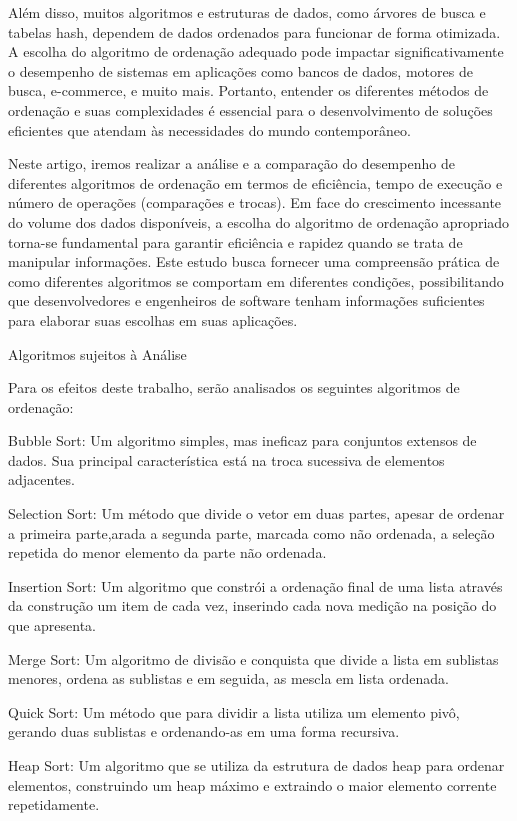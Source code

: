 \documentclass[tcc1,project]{uftex}
\begin{document}
Além disso, muitos algoritmos e estruturas de dados, como árvores de busca e tabelas hash, dependem de dados ordenados para funcionar de forma otimizada. A escolha do algoritmo de ordenação adequado pode impactar significativamente o desempenho de sistemas em aplicações como bancos de dados, motores de busca, e-commerce, e muito mais. Portanto, entender os diferentes métodos de ordenação e suas complexidades é essencial para o desenvolvimento de soluções eficientes que atendam às necessidades do mundo contemporâneo.

Neste artigo, iremos realizar a análise e a comparação do desempenho de diferentes algoritmos de ordenação em termos de eficiência, tempo de execução e número de operações (comparações e trocas). Em face do crescimento incessante do volume dos dados disponíveis, a escolha do algoritmo de ordenação apropriado torna-se fundamental para garantir eficiência e rapidez quando se trata de manipular informações. Este estudo busca fornecer uma compreensão prática de como diferentes algoritmos se comportam em diferentes condições, possibilitando que desenvolvedores e engenheiros de software tenham informações suficientes para elaborar suas escolhas em suas aplicações.

Algoritmos sujeitos à Análise

Para os efeitos deste trabalho, serão analisados os seguintes algoritmos de ordenação:

Bubble Sort: Um algoritmo simples, mas ineficaz para conjuntos extensos de dados. Sua principal característica está na troca sucessiva de elementos adjacentes.

Selection Sort: Um método que divide o vetor em duas partes, apesar de ordenar a primeira parte,arada a segunda parte, marcada como não ordenada, a seleção repetida do menor elemento da parte não ordenada.

Insertion Sort: Um algoritmo que constrói a ordenação final de uma lista através da construção um item de cada vez, inserindo cada nova medição na posição do que apresenta.

Merge Sort: Um algoritmo de divisão e conquista que divide a lista em sublistas menores, ordena as sublistas e em seguida, as mescla em lista ordenada. 

Quick Sort: Um método que para dividir a lista utiliza um elemento pivô, gerando duas sublistas e ordenando-as em uma forma recursiva.

Heap Sort: Um algoritmo que se utiliza da estrutura de dados heap para ordenar elementos, construindo um heap máximo e extraindo o maior elemento corrente repetidamente.
\end{document}
